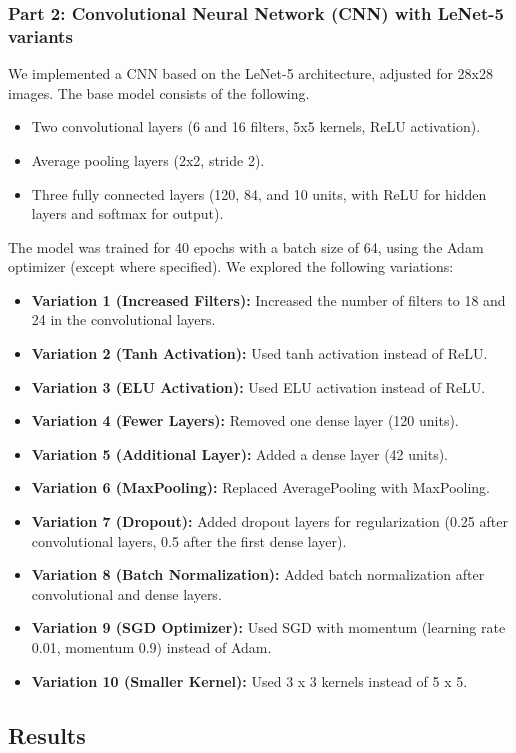 \documentclass[a4paper,12pt]{article}
\begin{document}
\subsubsection{Part 2: Convolutional Neural Network (CNN) with LeNet-5 variants}
We implemented a CNN based on the LeNet-5 architecture, adjusted for 28x28 images. The base model consists of the following.
\begin{itemize}
    \item Two convolutional layers (6 and 16 filters, 5x5 kernels, ReLU activation).
    \item Average pooling layers (2x2, stride 2).
    \item Three fully connected layers (120, 84, and 10 units, with ReLU for hidden layers and softmax for output).
\end{itemize}
The model was trained for 40 epochs with a batch size of 64, using the Adam optimizer (except where specified). We explored the following variations:
\begin{itemize}
    \item \textbf{Variation 1 (Increased Filters):} Increased the number of filters to 18 and 24 in the convolutional layers.
    \item \textbf{Variation 2 (Tanh Activation):} Used tanh activation instead of ReLU.
    \item \textbf{Variation 3 (ELU Activation):} Used ELU activation instead of ReLU.
    \item \textbf{Variation 4 (Fewer Layers):} Removed one dense layer (120 units).
    \item \textbf{Variation 5 (Additional Layer):} Added a dense layer (42 units).
    \item \textbf{Variation 6 (MaxPooling):} Replaced AveragePooling with MaxPooling.
    \item \textbf{Variation 7 (Dropout):} Added dropout layers for regularization (0.25 after convolutional layers, 0.5 after the first dense layer).
    \item \textbf{Variation 8 (Batch Normalization):} Added batch normalization after convolutional and dense layers.
    \item \textbf{Variation 9 (SGD Optimizer):} Used SGD with momentum (learning rate 0.01, momentum 0.9) instead of Adam.
    \item \textbf{Variation 10 (Smaller Kernel):} Used 3 x 3 kernels instead of 5 x 5.
\end{itemize}

\subsection{Results}
\end{document}
